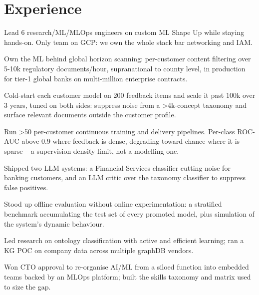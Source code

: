 \documentclass[a4paper]{deedy-resume} %
\begin{document}
\begin{minipage}[t]{0.66\textwidth} %

\section{Experience}

Lead 6 research/ML/MLOps engineers on custom ML Shape Up while staying hands-on. Only team on GCP: we own the whole stack bar networking and IAM.
\vspace{\topsep}
\begin{tightitemize}
\item Own the ML behind global horizon scanning: per-customer content filtering over 5-10k regulatory documents/hour, supranational to county level, in production for tier-1 global banks on multi-million enterprise contracts.
\item Cold-start each customer model on 200 feedback items and scale it past 100k over 3 years, tuned on both sides: suppress noise from a >4k-concept taxonomy and surface relevant documents outside the customer profile.
\item Run >50 per-customer continuous training and delivery pipelines. Per-class ROC-AUC above 0.9 where feedback is dense, degrading toward chance where it is sparse -- a supervision-density limit, not a modelling one.
\item Shipped two LLM systems: a Financial Services classifier cutting noise for banking customers, and an LLM critic over the taxonomy classifier to suppress false positives.
\item Stood up offline evaluation without online experimentation: a stratified benchmark accumulating the test set of every promoted model, plus simulation of the system's dynamic behaviour.
\item Led research on ontology classification with active and efficient learning; ran a KG POC on company data across multiple graphDB vendors.
\item Won CTO approval to re-organise AI/ML from a siloed function into embedded teams backed by an MLOps platform; built the skills taxonomy and matrix used to size the gap.
\end{tightitemize}
\sectionspace %



\end{minipage}
\end{document}
